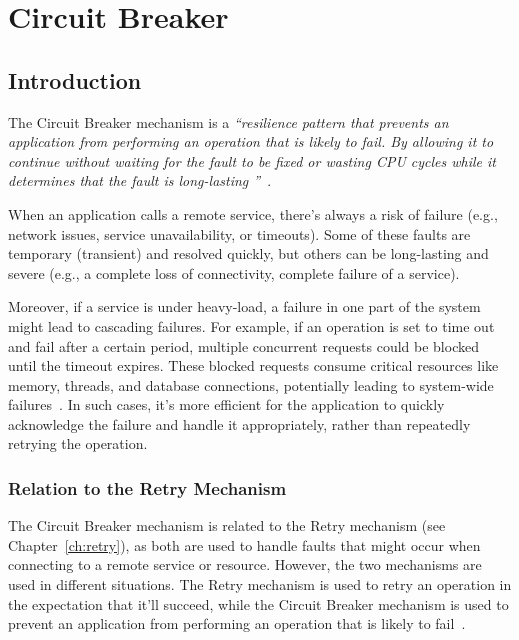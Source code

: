 \chapter{Circuit Breaker}\label{ch:circuit-breaker}



\section{Introduction}\label{sec:cbreaker-introduction}

The Circuit Breaker mechanism is a \textit{\enquote{resilience pattern
that prevents an application from performing an operation that is likely to fail.
By allowing it
to continue
without waiting for the fault to be fixed or wasting CPU cycles while it determines that the fault is long-lasting
}}~\cite{microsoft-cbreaker-pattern}.

When an application calls a remote service, there's always a risk of failure
(e.g., network issues, service unavailability, or timeouts).
Some of these faults are temporary (transient) and resolved quickly,
but others can be long-lasting and severe (e.g., a complete loss of connectivity, complete failure of a service).

Moreover, if a service is under heavy-load, a failure in one part of the system might lead to cascading failures.
For example, if an operation is set to time out and fail after a certain period, multiple concurrent requests could be blocked until the timeout expires.
These blocked requests consume critical resources like memory, threads, and database connections, potentially leading to system-wide failures~\cite{microsoft-cbreaker-pattern}.
In such cases, it’s more efficient for the application to quickly acknowledge the failure and handle it appropriately, rather than repeatedly retrying the operation.

\subsection{Relation to the Retry Mechanism}\label{subsec:cbreaker-relation-to-retry}

The Circuit Breaker mechanism is related to the Retry mechanism (see Chapter~\ref{ch:retry}), as both are used to handle faults that might occur when connecting to a remote service or resource.
However, the two mechanisms are used in different situations.
The Retry mechanism is used to retry an operation in the expectation that it'll succeed, while the Circuit Breaker mechanism is used to prevent an application from performing an operation that is likely to fail~\cite{microsoft-cbreaker-pattern}.

